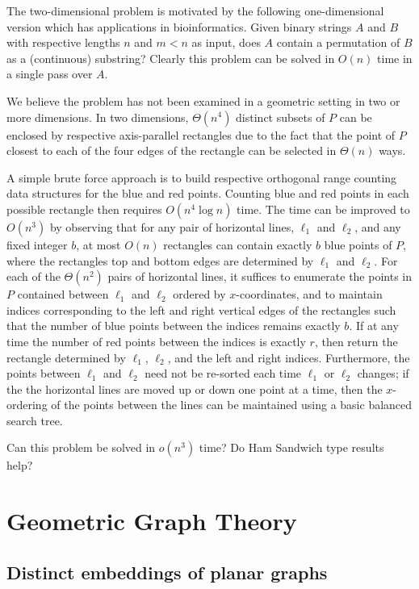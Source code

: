 \documentclass{patmorin}
\begin{document}
The two-dimensional problem is motivated by the following one-dimensional
version which has applications in bioinformatics.  Given binary strings
$A$ and $B$ with respective lengths $n$ and $m < n$ as input, does $A$
contain a permutation of $B$ as a (continuous) substring?  Clearly this
problem can be solved in $O(n)$ time in a single pass over $A$.

We believe the problem has not been examined in a geometric setting
in two or more dimensions.  In two dimensions, $\Theta(n^4)$ distinct
subsets of $P$ can be enclosed by respective axis-parallel rectangles
due to the fact that the point of $P$ closest to each of the four edges
of the rectangle can be selected in $\Theta(n)$ ways.

A simple brute force approach is to build respective orthogonal range
counting data structures for the blue and red points.  Counting blue and
red points in each possible rectangle then requires $O(n^4 \log n)$ time.
The time can be improved to $O(n^3)$ by observing that for any pair
of horizontal lines, $\ell_1$ and $\ell_2$, and any fixed integer $b$,
at most $O(n)$ rectangles can contain exactly $b$ blue points of $P$,
where the rectangles top and bottom edges are determined by $\ell_1$
and $\ell_2$.  For each of the $\Theta(n^2)$ pairs of horizontal lines,
it suffices to enumerate the points in $P$ contained between $\ell_1$ and
$\ell_2$ ordered by $x$-coordinates, and to maintain indices corresponding
to the left and right vertical edges of the rectangles such that the
number of blue points between the indices remains exactly $b$.  If at
any time the number of red points between the indices is exactly $r$,
then return the rectangle determined by $\ell_1$, $\ell_2$, and the
left and right indices.  Furthermore, the points between $\ell_1$ and
$\ell_2$ need not be re-sorted each time $\ell_1$ or $\ell_2$ changes;
if the the horizontal lines are moved up or down one point at a time,
then the $x$-ordering of the points between the lines can be maintained
using a basic balanced search tree.

Can this problem be solved in $o(n^3)$ time?  Do Ham Sandwich type
results help?




\section{Geometric Graph Theory}

\subsection{Distinct embeddings of planar graphs}
\end{document}
